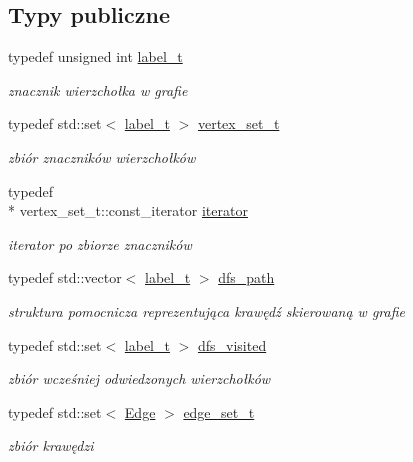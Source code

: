 \subsection*{Typy publiczne}
\begin{DoxyCompactItemize}
\item 
typedef unsigned int \hyperlink{classGraph_a2237a0ada8484c37b8200c0e3685ca71}{label\-\_\-t}
\begin{DoxyCompactList}\small\item\em znacznik wierzchołka w grafie \end{DoxyCompactList}\item 
typedef std\-::set$<$ \hyperlink{classGraph_a2237a0ada8484c37b8200c0e3685ca71}{label\-\_\-t} $>$ \hyperlink{classGraph_ac91822a10fe3fc10ea8449531fc32b95}{vertex\-\_\-set\-\_\-t}
\begin{DoxyCompactList}\small\item\em zbiór znaczników wierzchołków \end{DoxyCompactList}\item 
typedef \\*
vertex\-\_\-set\-\_\-t\-::const\-\_\-iterator \hyperlink{classGraph_a865985566962f6fcab1c0a465305424f}{iterator}
\begin{DoxyCompactList}\small\item\em iterator po zbiorze znaczników \end{DoxyCompactList}\item 
typedef std\-::vector$<$ \hyperlink{classGraph_a2237a0ada8484c37b8200c0e3685ca71}{label\-\_\-t} $>$ \hyperlink{classGraph_a8d2f79e14998a438e64bf07f31abb359}{dfs\-\_\-path}
\begin{DoxyCompactList}\small\item\em struktura pomocnicza reprezentująca krawędź skierowaną w grafie \end{DoxyCompactList}\item 
typedef std\-::set$<$ \hyperlink{classGraph_a2237a0ada8484c37b8200c0e3685ca71}{label\-\_\-t} $>$ \hyperlink{classGraph_af10e18e1cb3834650bd69bad6bec3fc0}{dfs\-\_\-visited}
\begin{DoxyCompactList}\small\item\em zbiór wcześniej odwiedzonych wierzchołków \end{DoxyCompactList}\item 
typedef std\-::set$<$ \hyperlink{structGraph_1_1Edge}{Edge} $>$ \hyperlink{classGraph_a7875f5959501bdafb3ba4dd428dfb10b}{edge\-\_\-set\-\_\-t}
\begin{DoxyCompactList}\small\item\em zbiór krawędzi \end{DoxyCompactList}\end{DoxyCompactItemize}
